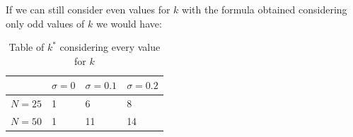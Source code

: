 \documentclass[a4paper,10pt]{article}
\begin{document}
\begin{enumerate}
    If we can still consider even values for $k$ with the formula obtained considering only odd values of $k$ we would have:
    \begin{table}[H]
      \centering
      \begin{tabular}{l|l|l|l|}
      \cline{2-4}
                               & $\sigma = 0$ & $\sigma = 0.1$ & $\sigma = 0.2$ \\ \hline
      \multicolumn{1}{|l|}{$N = 25$} & 1  &  6  &  8 \\ \hline
      \multicolumn{1}{|l|}{$N = 50$} & 1  &  11   &  14 \\ \hline
      \end{tabular}
      \caption{Table of $k^*$ considering every value for $k$}
    \end{table}




\end{enumerate}
\end{document}
